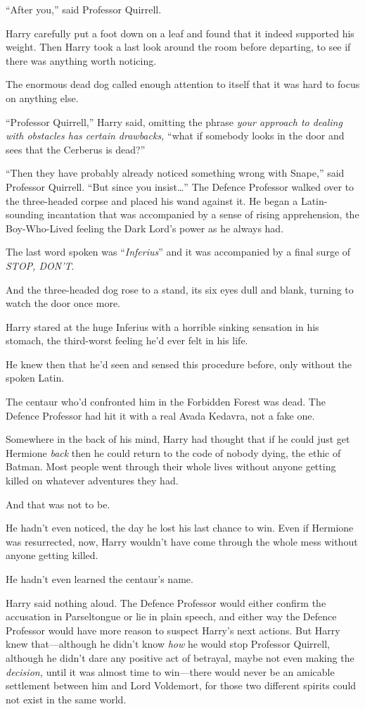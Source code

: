 “After you,” said Professor Quirrell.

Harry carefully put a foot down on a leaf and found that it indeed supported his weight. Then Harry took a last look around the room before departing, to see if there was anything worth noticing.

The enormous dead dog called enough attention to itself that it was hard to focus on anything else.

“Professor Quirrell,” Harry said, omitting the phrase \emph{your approach to dealing with obstacles has certain drawbacks,} “what if somebody looks in the door and sees that the Cerberus is dead?”

“Then they have probably already noticed something wrong with Snape,” said Professor Quirrell. “But since you insist…” The Defence Professor walked over to the three-headed corpse and placed his wand against it. He began a Latin-sounding incantation that was accompanied by a sense of rising apprehension, the Boy-Who-Lived feeling the Dark Lord’s power as he always had.

The last word spoken was “\emph{Inferius}” and it was accompanied by a final surge of \emph{STOP, DON’T}.

And the three-headed dog rose to a stand, its six eyes dull and blank, turning to watch the door once more.

Harry stared at the huge Inferius with a horrible sinking sensation in his stomach, the third-worst feeling he’d ever felt in his life.

He knew then that he’d seen and sensed this procedure before, only without the spoken Latin.

The centaur who’d confronted him in the Forbidden Forest was dead. The Defence Professor had hit it with a real Avada Kedavra, not a fake one.

Somewhere in the back of his mind, Harry had thought that if he could just get Hermione \emph{back} then he could return to the code of nobody dying, the ethic of Batman. Most people went through their whole lives without anyone getting killed on whatever adventures they had.

And that was not to be.

He hadn’t even noticed, the day he lost his last chance to win. Even if Hermione was resurrected, now, Harry wouldn’t have come through the whole mess without anyone getting killed.

He hadn’t even learned the centaur’s name.

Harry said nothing aloud. The Defence Professor would either confirm the accusation in Parseltongue or lie in plain speech, and either way the Defence Professor would have more reason to suspect Harry’s next actions. But Harry knew that—although he didn’t know \emph{how} he would stop Professor Quirrell, although he didn’t dare any positive act of betrayal, maybe not even making the \emph{decision,} until it was almost time to win—there would never be an amicable settlement between him and Lord Voldemort, for those two different spirits could not exist in the same world.

